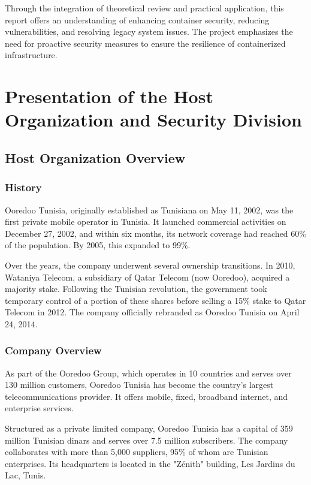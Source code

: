 \documentclass[12pt,a4paper]{report}
\begin{document}
Through the integration of theoretical review and practical application, this report offers an understanding of enhancing container security, reducing vulnerabilities, and resolving legacy system issues. The project emphasizes the need for proactive security measures to ensure the resilience of containerized infrastructure.


\newpage

\setcounter{chapter}{0} %
\chapter{Presentation of the Host Organization and Security Division}

\section{Host Organization Overview}

\subsection{History}
Ooredoo Tunisia, originally established as Tunisiana on May 11, 2002, was the first private mobile operator in Tunisia. It launched commercial activities on December 27, 2002, and within six months, its network coverage had reached 60\% of the population. By 2005, this expanded to 99\%.

Over the years, the company underwent several ownership transitions. In 2010, Wataniya Telecom, a subsidiary of Qatar Telecom (now Ooredoo), acquired a majority stake. Following the Tunisian revolution, the government took temporary control of a portion of these shares before selling a 15\% stake to Qatar Telecom in 2012. The company officially rebranded as Ooredoo Tunisia on April 24, 2014.

\subsection{Company Overview}
As part of the Ooredoo Group, which operates in 10 countries and serves over 130 million customers, Ooredoo Tunisia has become the country’s largest telecommunications provider. It offers mobile, fixed, broadband internet, and enterprise services.

Structured as a private limited company, Ooredoo Tunisia has a capital of 359 million Tunisian dinars and serves over 7.5 million subscribers. The company collaborates with more than 5,000 suppliers, 95\% of whom are Tunisian enterprises. Its headquarters is located in the "Z\'enith" building, Les Jardins du Lac, Tunis.
\end{document}
